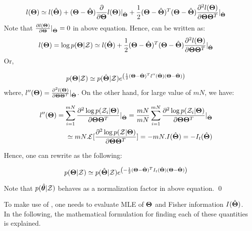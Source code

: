 \documentclass[]{article}
\begin{document}
\begin{equation}\label{proof2}
l(\boldsymbol{\Theta}) \simeq l(\hat{\boldsymbol{\Theta}})+(\boldsymbol{\Theta}-\hat{\boldsymbol{\Theta}})\frac{\partial}{\partial \boldsymbol{\Theta}} l(\boldsymbol{\Theta})|_{\hat{\boldsymbol{\Theta}}} + \frac{1}{2}(\boldsymbol{\Theta}-\hat{\boldsymbol{\Theta}})^T(\boldsymbol{\Theta}-\hat{\boldsymbol{\Theta}})\frac{\partial^2 l(\boldsymbol{\Theta})}{\partial \boldsymbol{\Theta}\boldsymbol{\Theta}^T}|_{\hat{\boldsymbol{\Theta}}}
\end{equation}
Note that $\frac{\partial l(\boldsymbol{\Theta})}{\partial \boldsymbol{\Theta}}|_{\hat{\boldsymbol{\Theta}}} = 0$ in above equation. Hence,  can be written as:
\textbf{\begin{equation}\label{proof3}
l(\boldsymbol{\Theta}) = \log p(\boldsymbol{\Theta}|\mathcal{Z}) \simeq l(\hat{\boldsymbol{\Theta}}) + \frac{1}{2}(\boldsymbol{\Theta}-\hat{\boldsymbol{\Theta}})^T(\boldsymbol{\Theta}-\hat{\boldsymbol{\Theta}})\frac{\partial^2 l(\boldsymbol{\Theta})}{\partial \boldsymbol{\Theta}\boldsymbol{\Theta}^T}|_{\hat{\boldsymbol{\Theta}}}
\end{equation}}
Or,

\begin{eqnarray}\label{exponential}
p(\boldsymbol{\Theta}|\mathcal{Z})\simeq p(\hat{\boldsymbol{\Theta}}|\mathcal{Z})e^{\left(\frac{1}{2}(\boldsymbol{\Theta}-\hat{\boldsymbol{\Theta}})^Tl''(\hat{\boldsymbol{\Theta}})(\boldsymbol{\Theta}-\hat{\boldsymbol{\Theta}})\right)}
\end{eqnarray}
where, $l''(\boldsymbol{\Theta})= \frac{\partial^2 l(\boldsymbol{\Theta})}{\partial \boldsymbol{\Theta}\boldsymbol{\Theta}^T}|_{\hat{\boldsymbol{\Theta}}}$. On the other hand, for large value of $mN$, we have:

\begin{eqnarray}
l''(\boldsymbol{\Theta})= \sum_{i=1}^{mN} \frac{\partial^2 \log p(\mathcal{Z}_i|\boldsymbol{\Theta})}{\partial \boldsymbol{\Theta}\boldsymbol{\Theta}^T}|_{\hat{\boldsymbol{\Theta}}}=\frac{mN}{mN}\sum_{i=1}^{mN} \frac{\partial^2 \log p(\mathcal{Z}_i|\boldsymbol{\Theta})}{\partial \boldsymbol{\Theta}\boldsymbol{\Theta}^T}|_{\hat{\boldsymbol{\Theta}}}\nonumber \\
 \simeq mN.\mathcal{E}^{}[\frac{\partial^2 \log p(\mathcal{Z}|\boldsymbol{\Theta})}{\partial \boldsymbol{\Theta}\boldsymbol{\Theta}^T}] = -mN.I(\hat{\boldsymbol{\Theta}})=-I_t(\hat{\boldsymbol{\Theta}})
\end{eqnarray}

Hence, one can rewrite  as the following:

\begin{equation}
p(\boldsymbol{\Theta}|\mathcal{Z})\simeq p(\hat{\boldsymbol{\Theta}}|\mathcal{Z})e^{\left(-\frac{1}{2}(\boldsymbol{\Theta}-\hat{\boldsymbol{\Theta}})^TI_t(\hat{\boldsymbol{\Theta}})(\boldsymbol{\Theta}-\hat{\boldsymbol{\Theta}})\right)}
\end{equation}

Note that $p(\hat{\boldsymbol{\theta}}|\mathcal{Z})$ behaves as a normalization factor in above equation.
\qed

\vspace{0.1in}

To make use of , one needs to evaluate MLE of $\boldsymbol{\Theta}$ and Fisher information $I(\hat{\boldsymbol{\Theta}})$. In the following, the mathematical formulation for finding each of these quantities is explained.
\end{document}
